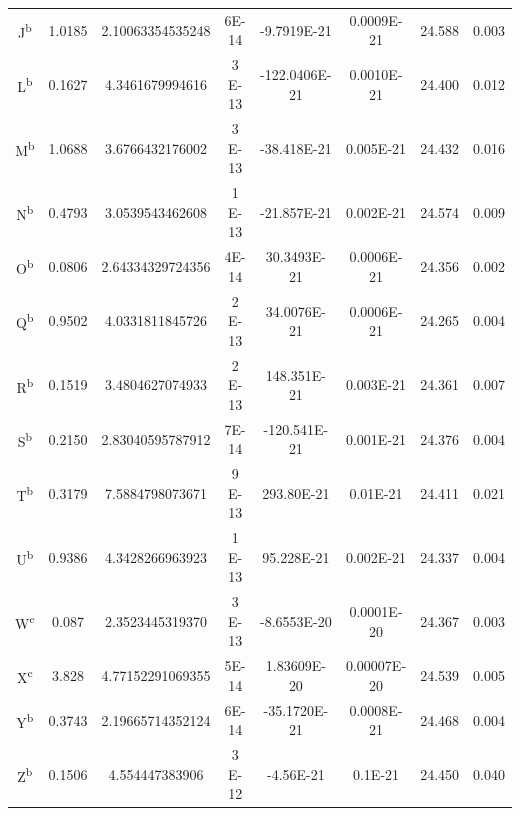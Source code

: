 \begin{table}
\begin{tabular}{c c c c c c c c}
        J\textsuperscript{b}          & 1.0185       & 2.10063354535248 & \num{6E-14}     & \num{-9.7919E-21}   & \num{0.0009E-21}       & 24.588      & 0.003               \\
        L\textsuperscript{b}          & 0.1627       & 4.3461679994616  & \num{3 E-13}    & \num{-122.0406E-21} & \num{0.0010E-21}       & 24.400      & 0.012               \\
        M\textsuperscript{b}          & 1.0688       & 3.6766432176002  & \num{3 E-13}    & \num{-38.418E-21}   & \num{0.005E-21}        & 24.432      & 0.016               \\
        N\textsuperscript{b}          & 0.4793       & 3.0539543462608  & \num{1 E-13}    & \num{-21.857E-21}   & \num{0.002E-21}        & 24.574      & 0.009               \\
        O\textsuperscript{b}          & 0.0806       & 2.64334329724356 & \num{4E-14}     & \num{30.3493E-21}   & \num{0.0006E-21}       & 24.356      & 0.002               \\
        Q\textsuperscript{b}          & 0.9502       & 4.0331811845726  & \num{2 E-13}    & \num{34.0076E-21}   & \num{0.0006E-21}       & 24.265      & 0.004               \\
        R\textsuperscript{b}          & 0.1519       & 3.4804627074933  & \num{2 E-13}    & \num{148.351E-21}   & \num{0.003E-21}        & 24.361      & 0.007               \\
        S\textsuperscript{b}          & 0.2150       & 2.83040595787912 & \num{7E-14}     & \num{-120.541E-21}  & \num{0.001E-21}        & 24.376      & 0.004               \\
        T\textsuperscript{b}          & 0.3179       & 7.5884798073671  & \num{9 E-13}    & \num{293.80E-21}    & \num{0.01E-21}         & 24.411      & 0.021               \\
        U\textsuperscript{b}          & 0.9386       & 4.3428266963923  & \num{1 E-13}    & \num{95.228E-21}    & \num{0.002E-21}        & 24.337      & 0.004               \\
        W\textsuperscript{c}          & 0.087        & 2.3523445319370  & \num{3 E-13}    & \num{-8.6553E-20}   & \num{0.0001E-20}       & 24.367      & 0.003               \\
        X\textsuperscript{c}          & 3.828        & 4.77152291069355 & \num{5E-14}     & \num{1.83609E-20}   & \num{0.00007E-20}      & 24.539      & 0.005               \\
        Y\textsuperscript{b}          & 0.3743       & 2.19665714352124 & \num{6E-14}     & \num{-35.1720E-21}  & \num{0.0008E-21}       & 24.468      & 0.004               \\
        Z\textsuperscript{b}          & 0.1506       & 4.554447383906   & \num{3  E-12}   & \num{-4.56E-21}     & \num{0.1E-21}          & 24.450      & 0.040               \\
        \hline
    \end{tabular}

    \label{tab:pulsars_spin}

\end{table}


